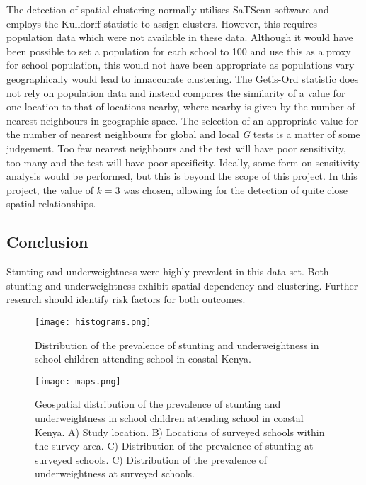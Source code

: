 \documentclass[11pt,a4paper,twoside]{article}\usepackage[]{graphicx}\usepackage[]{color}
\begin{document}
The detection of spatial clustering normally utilises SaTScan software and employs the Kulldorff statistic to assign clusters. 
However, this requires population data which were not available in these data. 
Although it would have been possible to set a population for each school to 100 and use this as a proxy for school population, this would not have been appropriate as populations vary geographically would lead to innaccurate clustering. 
The Getis-Ord statistic does not rely on population data and instead compares the similarity of a value for one location to that of locations nearby, where nearby is given by the number of nearest neighbours in geographic space.
The selection of an appropriate value for the number of nearest neighbours for global and local \textit{G} tests is a matter of some judgement.
Too few nearest neighbours and the test will have poor sensitivity, too many and the test will have poor specificity. 
Ideally, some form on sensitivity analysis would be performed, but this is beyond the scope of this project. 
In this project, the value of $k=3$ was chosen, allowing for the detection of quite close spatial relationships. 

\subsection{Conclusion}
Stunting and underweightness were highly prevalent in this data set. 
Both stunting and underweightness exhibit spatial dependency and clustering. 
Further research should identify risk factors for both outcomes. 
\clearpage

\begin{sidewaysfigure}[H]
\texttt{[image: histograms.png]}
\caption{Distribution of the prevalence of stunting and underweightness in school children attending school in coastal Kenya.}
\label{dist}
\end{sidewaysfigure}
\clearpage

\begin{figure}[H]
\texttt{[image: maps.png]}
\caption{Geospatial distribution of the prevalence of stunting and underweightness in school children attending school in coastal Kenya. A) Study location. B) Locations of surveyed schools within the survey area. C) Distribution of the prevalence of stunting at surveyed schools. C) Distribution of the prevalence of underweightness at surveyed schools.}
\label{dist_maps}
\end{figure}
\clearpage
\end{document}
